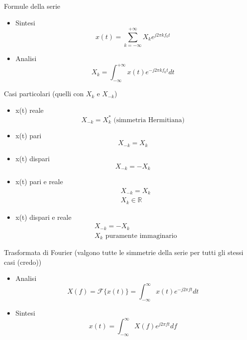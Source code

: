 \documentclass{article}
\begin{document}
Formule della serie
\begin{itemize}
\item Sintesi \begin{equation*}
  x(t) = \sum_{k=-\infty}^{+\infty} X_k e^{j2\pi kf_0 t}
\end{equation*}
\item Analisi \begin{equation*}
  X_k = \int_{-\infty}^{+\infty} x(t) e^{-j2\pi kf_0 t} dt
\end{equation*}
\end{itemize}

Casi particolari (quelli con $X_k$ e $X_{-k}$)
\begin{itemize}
\item x(t) reale \begin{equation*}
  X_{-k} = X^*_k \text{ (simmetria Hermitiana)}
\end{equation*}
\item x(t) pari \begin{equation*}
  X_{-k} = X_k 
\end{equation*}
\item x(t) dispari \begin{equation*}
  X_{-k} = -X_k
\end{equation*}
\item x(t) pari e reale \begin{align*}
  &X_{-k} = X_k\\
  &X_k \in \mathbb{R}
\end{align*}
\item x(t) dispari e reale \begin{align*}
  &X_{-k} = -X_k \\
  &X_k\text{ puramente immaginario}
\end{align*}
\end{itemize}
  
Trasformata di Fourier (valgono tutte le simmetrie della serie per tutti gli stessi casi (credo))
\begin{itemize}
\item Analisi \begin{equation*}
  X(f)=\mathcal{F}\{x(t)\}=\int_{-\infty}^{\infty} x(t) e^{-j2\pi ft} dt
\end{equation*}
\item Sintesi \begin{equation*}
  x(t)=\int_{-\infty}^{\infty} X(f) e^{j2\pi ft} df
\end{equation*}
\end{itemize}
\end{document}
